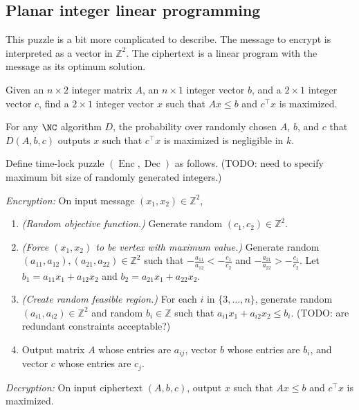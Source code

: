 \documentclass{article}
\newcommand{\Enc}{\operatorname{Enc}}
\newcommand{\Dec}{\operatorname{Dec}}
\begin{document}
\subsection{Planar integer linear programming}

This puzzle is a bit more complicated to describe.
The message to encrypt is interpreted as a vector in $\mathbb{Z}^2$.
The ciphertext is a linear program with the message as its optimum solution.

\begin{definition}
  Given an $n \times 2$ integer matrix $A$, an $n \times 1$ integer vector $b$, and a $2 \times 1$ integer vector $c$, find a $2 \times 1$ integer vector $x$ such that $Ax \leq b$ and $c^\intercal x$ is maximized.
\end{definition}

\begin{assumption}
  For any $\NC$ algorithm $D$, the probability over randomly chosen $A$, $b$, and $c$ that $D(A, b, c)$ outputs $x$ such that $c^\intercal x$ is maximized is negligible in $k$.
\end{assumption}

\begin{protocol}
  Define time-lock puzzle $(\Enc, \Dec)$ as follows.
  (TODO: need to specify maximum bit size of randomly generated integers.)

  \emph{Encryption:} On input message $(x_1, x_2) \in \mathbb{Z}^2$,
  \begin{enumerate}
  \item \emph{(Random objective function.)}
    Generate random $(c_1, c_2) \in \mathbb{Z}^2$.
  \item \emph{(Force $(x_1, x_2)$ to be vertex with maximum value.)}
    Generate random $(a_{11}, a_{12}), (a_{21}, a_{22}) \in \mathbb{Z}^2$ such that $-\frac{a_{11}}{a_{12}} < -\frac{c_1}{c_2}$ and $-\frac{a_{21}}{a_{22}} > -\frac{c_1}{c_2}$.
    Let $b_1 = a_{11} x_1 + a_{12} x_2$ and $b_2 = a_{21} x_1 + a_{22} x_2$.
  \item \emph{(Create random feasible region.)}
    For each $i$ in $\{3, \dotsc, n\}$, generate random $(a_{i1}, a_{i2}) \in \mathbb{Z}^2$ and random $b_i \in \mathbb{Z}$ such that $a_{i1} x_1 + a_{i2} x_2 \leq b_i$.
    (TODO: are redundant constraints acceptable?)
  \item Output matrix $A$ whose entries are $a_{ij}$, vector $b$ whose entries are $b_i$, and vector $c$ whose entries are $c_j$.
  \end{enumerate}

  \emph{Decryption:} On input ciphertext $(A, b, c)$, output $x$ such that $Ax \leq b$ and $c^\intercal x$ is maximized.
\end{protocol}
\end{document}
